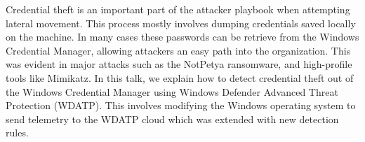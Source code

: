 \def\abstracttitle{"May I See Your Credentials, Please?"}
\def\abstractcomment{Regular Talk}
\def\abstractowner{Dana Baril}

\thispagestyle{abstract}

Credential theft is an important part of the attacker playbook when attempting lateral movement. This process mostly involves dumping credentials saved locally on the machine. In many cases these passwords can be retrieve from the Windows Credential Manager, allowing attackers an easy path into the organization. This was evident in major attacks such as the NotPetya ransomware, and high-profile tools like Mimikatz.
In this talk, we explain how to detect credential theft out of the Windows Credential Manager using Windows Defender Advanced Threat Protection (WDATP). This involves modifying the Windows operating system to send telemetry to the WDATP cloud which was extended with new detection rules.
